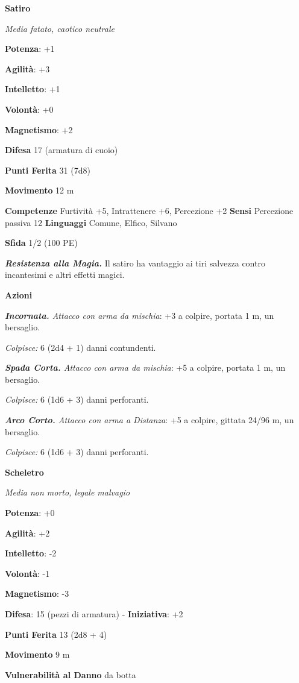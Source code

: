 \begin{multicols}{2}
\textbf{Satiro}

\emph{Media fatato, caotico neutrale}

\textbf{Potenza}: +1

\textbf{Agilità}: +3

\textbf{Intelletto}: +1

\textbf{Volontà}: +0

\textbf{Magnetismo}: +2

\textbf{Difesa} 17 (armatura di cuoio)

\textbf{Punti Ferita} 31 (7d8)

\textbf{Movimento} 12 m

\textbf{Competenze} Furtività +5, Intrattenere +6, Percezione +2
\textbf{Sensi} Percezione passiva 12 \textbf{Linguaggi} Comune, Elfico,
Silvano

\textbf{Sfida} 1/2 (100 PE)\smallskip

\emph{\textbf{Resistenza alla Magia.}} Il satiro ha vantaggio ai tiri
salvezza contro incantesimi e altri effetti magici.

\smallskip\textbf{Azioni}

\emph{\textbf{Incornata.} Attacco con arma da mischia}: +3 a colpire,
portata 1 m, un bersaglio.

\emph{Colpisce:} 6 (2d4 + 1) danni contundenti.

\emph{\textbf{Spada Corta.} Attacco con arma da mischia}: +5 a colpire,
portata 1 m, un bersaglio.

\emph{Colpisce:} 6 (1d6 + 3) danni perforanti.

\emph{\textbf{Arco Corto.} Attacco con arma a Distanza}: +5 a colpire,
gittata 24/96 m, un bersaglio.

\emph{Colpisce:} 6 (1d6 + 3) danni perforanti.

\textbf{Scheletro}

\emph{Media non morto, legale malvagio}

\textbf{Potenza}: +0

\textbf{Agilità}: +2

\textbf{Intelletto}: -2

\textbf{Volontà}: -1

\textbf{Magnetismo}: -3

\textbf{Difesa}: 15 (pezzi di armatura) - \textbf{Iniziativa}: +2

\textbf{Punti Ferita} 13 (2d8 + 4)

\textbf{Movimento} 9 m

\textbf{Vulnerabilità al Danno} da botta


\end{multicols}
